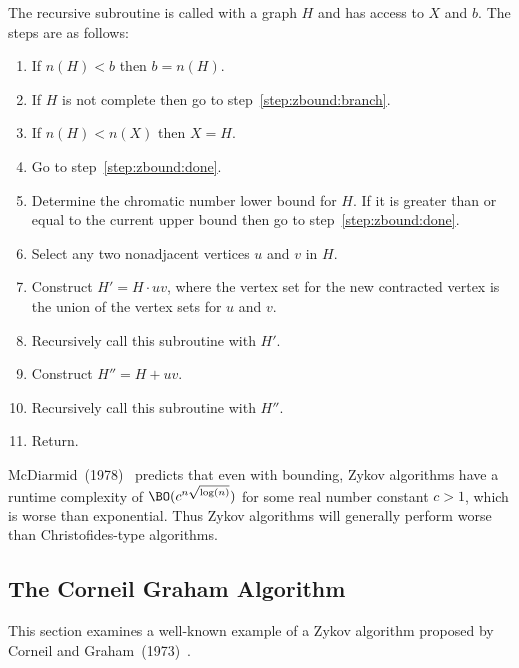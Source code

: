 The recursive subroutine is called with a graph \(H\) and has access to \(X\) and \(b\).  The steps are as follows:
\begin{enumerate}
\item If \(n(H)<b\) then \(b=n(H)\).
\item If \(H\) is not complete then go to step~\ref{step:zbound:branch}.
\item If \(n(H)<n(X)\) then \(X=H\).
\item Go to step~\ref{step:zbound:done}.
\item Determine the chromatic number lower bound for \(H\).  If it is greater than or equal to the current
  upper bound then go to step~\ref{step:zbound:done}.
\item\label{step:zbound:branch} Select any two nonadjacent vertices \(u\) and \(v\) in \(H\).
\item Construct \(H'=H\cdot uv\), where the vertex set for the new contracted vertex is the union of the vertex
  sets for \(u\) and \(v\).
\item Recursively call this subroutine with \(H'\).
\item Construct \(H''=H+uv\).
\item Recursively call this subroutine with \(H''\).
\item\label{step:zbound:done} Return.
\end{enumerate}

McDiarmid~(1978)~\cite{mcdiarmid} predicts that even with bounding, Zykov algorithms have a runtime complexity of
\(\BO(c^{n\sqrt{\log(n)}})\) for some real number constant \(c>1\), which is worse than exponential.  Thus Zykov
algorithms will generally perform worse than Christofides-type algorithms.

\subsection{The Corneil Graham Algorithm}\label{sec:sub:corneil}

This section examines a well-known example of a Zykov algorithm proposed by Corneil and
Graham~(1973)~\cite{corneil}.
